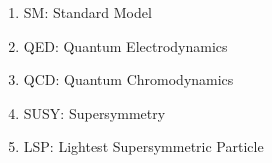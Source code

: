 \begin{enumerate}[]
\item SM: Standard Model
\item QED: Quantum Electrodynamics
\item QCD: Quantum Chromodynamics
\item SUSY: Supersymmetry
\item LSP: Lightest Supersymmetric Particle
\end{enumerate}